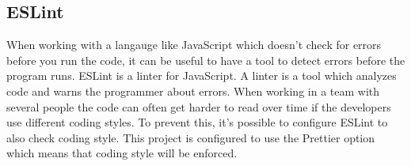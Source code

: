 \subsection{ESLint}
When working with a langauge like JavaScript which doesn't check for errors before you run the code, it can be useful to have a tool to detect errors before the program runs. ESLint is a linter for JavaScript. A linter is a tool which analyzes code and warns the programmer about errors. When working in a team with several people the code can often get harder to read over time if the developers use different coding styles. To prevent this, it's possible to configure ESLint to also check coding style. This project is configured to use the Prettier option which means that coding style will be enforced. 